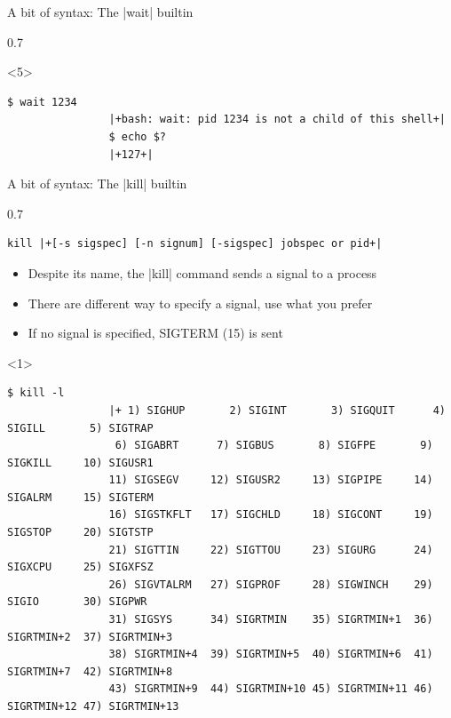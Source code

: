 \begin{frame}[fragile]{A bit of syntax: The \bash|wait| builtin}
\begin{overlayarea}{\textwidth}{0.7\textheight}
\begin{onlyenv}
        \end{onlyenv}
        \begin{onlyenv}<5>
            \begin{lstlisting}[style=MyBash, numbers=none, aboveskip=3mm]
                $ wait 1234
                |+bash: wait: pid 1234 is not a child of this shell+|
                $ echo $?
                |+127+|
            \end{lstlisting}
        \end{onlyenv}
    \end{overlayarea}
\end{frame}
\begin{frame}[fragile]{A bit of syntax: The \bash|kill| builtin}
    \begin{overlayarea}{\textwidth}{0.7\textheight}
        \begin{lstlisting}[style=MyBash, numbers=none, belowskip=-6mm]
            kill |+[-s sigspec] [-n signum] [-sigspec] jobspec or pid+|
        \end{lstlisting}
        \begin{itemize}
            \item Despite its name, the \bash|kill| command sends a signal to a process
            \item There are different way to specify a signal, use what you prefer
            \item If no signal is specified, SIGTERM (15) is sent
        \end{itemize}
        \begin{onlyenv}<1>
            \begin{lstlisting}[style=MyBash, style=smaller, numbers=none, xleftmargin=1mm]
                $ kill -l
                |+ 1) SIGHUP       2) SIGINT       3) SIGQUIT      4) SIGILL       5) SIGTRAP
                 6) SIGABRT      7) SIGBUS       8) SIGFPE       9) SIGKILL     10) SIGUSR1
                11) SIGSEGV     12) SIGUSR2     13) SIGPIPE     14) SIGALRM     15) SIGTERM
                16) SIGSTKFLT   17) SIGCHLD     18) SIGCONT     19) SIGSTOP     20) SIGTSTP
                21) SIGTTIN     22) SIGTTOU     23) SIGURG      24) SIGXCPU     25) SIGXFSZ
                26) SIGVTALRM   27) SIGPROF     28) SIGWINCH    29) SIGIO       30) SIGPWR
                31) SIGSYS      34) SIGRTMIN    35) SIGRTMIN+1  36) SIGRTMIN+2  37) SIGRTMIN+3
                38) SIGRTMIN+4  39) SIGRTMIN+5  40) SIGRTMIN+6  41) SIGRTMIN+7  42) SIGRTMIN+8
                43) SIGRTMIN+9  44) SIGRTMIN+10 45) SIGRTMIN+11 46) SIGRTMIN+12 47) SIGRTMIN+13

\end{lstlisting}
\end{onlyenv}
\end{overlayarea}
\end{frame}
